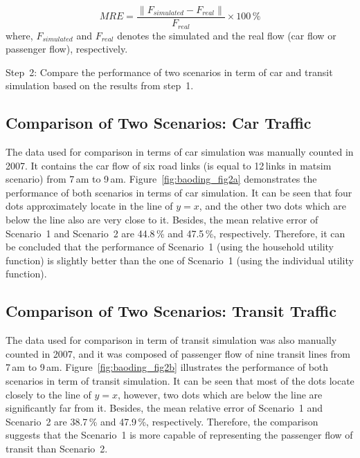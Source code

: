 \begin{equation}
\label{eq:baoding_mre}
MRE = \frac{\lVert F_{simulated} - F_{real} \lVert}{F_{real}} \times 100\,\%
\end{equation} 
where, $F_{simulated}$ and $F_{real}$ denotes the simulated and the real flow (car flow or passenger flow), respectively.

Step~2: Compare the performance of two scenarios in term of car and transit simulation based on the results from step~1. 

\subsection{Comparison of Two Scenarios: Car Traffic}
The data used for comparison in terms of car simulation was manually counted in 2007. 
It contains the car flow of six road links (is equal to 12\,links in \gls{matsim} scenario) from 7\,am to 9\,am. 
Figure~\ref{fig:baoding_fig2a} demonstrates the performance of both scenarios in terms of car simulation. 
It can be seen that four dots approximately locate in the line of $y=x$, and the other two dots which are below the line also are very close to it. 
Besides, the mean relative error of Scenario~1 and Scenario~2 are 44.8\,\% and 47.5\,\%, respectively. 
Therefore, it can be concluded that the performance of Scenario~1 (using the household utility function) is slightly better than the one of Scenario~1 (using the individual utility function). 

\subsection{Comparison of Two Scenarios: Transit Traffic}
The data used for comparison in term of transit simulation was also manually counted in 2007, and it was composed of passenger flow of nine transit lines from 7\,am to 9\,am. Figure~\ref{fig:baoding_fig2b} illustrates the performance of both scenarios in term of transit simulation. 
It can be seen that most of the dots locate closely to the line of $y=x$, however, two dots which are below the line are significantly far from it. 
Besides, the mean relative error of Scenario~1 and Scenario~2 are 38.7\,\% and 47.9\,\%, respectively. 
Therefore, the comparison suggests that the Scenario~1 is more capable of representing the passenger flow of transit than Scenario~2. 

